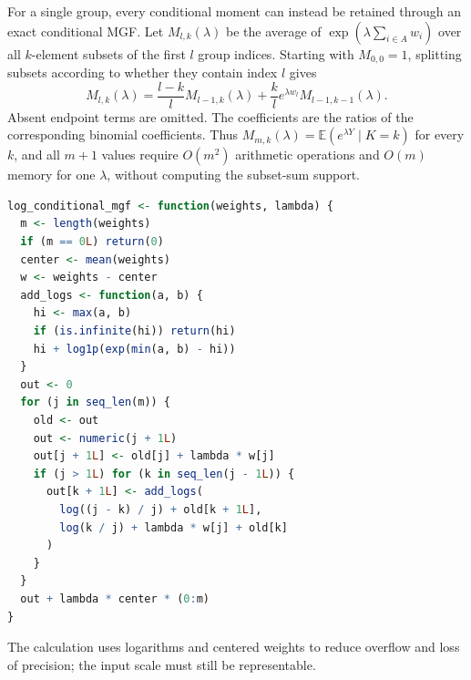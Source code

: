 \documentclass[11pt,letterpaper]{article}
\numberwithin{equation}{section}
\theoremstyle{definition}
\theoremstyle{remark}
\newcommand{\E}{\mathbb E}
\begin{document}
For a single group, every conditional moment can instead be retained
through an exact conditional MGF. Let $M_{l,k}(\lambda)$ be the average of
$\exp(\lambda\sum_{i\in A}w_i)$ over all $k$-element subsets of the
first $l$ group indices. Starting with $M_{0,0}=1$, splitting subsets
according to whether they contain index $l$ gives
\begin{equation}
 M_{l,k}(\lambda)=\frac{l-k}{l}M_{l-1,k}(\lambda)
    +\frac{k}{l}e^{\lambda w_l}M_{l-1,k-1}(\lambda).
 \label{eq:aggregation-mgf-dp}
\end{equation}
Absent endpoint terms are omitted. The coefficients are the ratios of
the corresponding binomial coefficients. Thus
$M_{m,k}(\lambda)=\E(e^{\lambda Y}\mid K=k)$ for every $k$, and all
$m+1$ values require $O(m^2)$ arithmetic operations and $O(m)$ memory
for one $\lambda$, without computing the subset-sum support.


\begin{minipage}{\linewidth}
\begin{lstlisting}[language=R]
log_conditional_mgf <- function(weights, lambda) {
  m <- length(weights)
  if (m == 0L) return(0)
  center <- mean(weights)
  w <- weights - center
  add_logs <- function(a, b) {
    hi <- max(a, b)
    if (is.infinite(hi)) return(hi)
    hi + log1p(exp(min(a, b) - hi))
  }
  out <- 0
  for (j in seq_len(m)) {
    old <- out
    out <- numeric(j + 1L)
    out[j + 1L] <- old[j] + lambda * w[j]
    if (j > 1L) for (k in seq_len(j - 1L)) {
      out[k + 1L] <- add_logs(
        log((j - k) / j) + old[k + 1L],
        log(k / j) + lambda * w[j] + old[k]
      )
    }
  }
  out + lambda * center * (0:m)
}
\end{lstlisting}
\end{minipage}

The calculation uses logarithms and centered weights to reduce overflow
and loss of precision; the input scale must still be representable.
\end{document}

